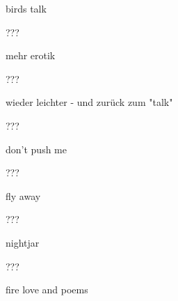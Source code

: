 \documentclass[a4paper, landscape, twocolumn]{article}
\begin{document}
 
\setlength{\parindent}{0pt} 
\fontsize{10}{12}\selectfont 
\setlength{\parskip}{0pt} 
\pagestyle{empty}

\newpage
\mbox{}
\newpage

{\huge \sc birds talk}
\newpage
\mbox{}
\newpage
\begin{verse}

\end{verse}
\newpage

\begin{verse}

\end{verse}
\newpage

\begin{verse}

\end{verse}
\newpage

\begin{verse}

\end{verse}
\newpage

\begin{verse}

\end{verse}
\newpage

\begin{verse}
\enlargethispage*{100cm}

\end{verse}
\newpage

\begin{verse}

\end{verse}
\newpage

???

mehr erotik
\newpage

\begin{verse}

\end{verse}
\newpage

\begin{verse}

\end{verse}
\newpage

???

wieder leichter - und zurück zum "talk"
\newpage

\begin{verse}

\end{verse}
\newpage
\begin{verse}

\end{verse}
\newpage
\begin{verse}

\end{verse}
\newpage

\begin{verse}

\end{verse}
\newpage

???

don't push me
\newpage

???

fly away
\newpage

???

nightjar
\newpage

???

fire love and poems
\end{document}
